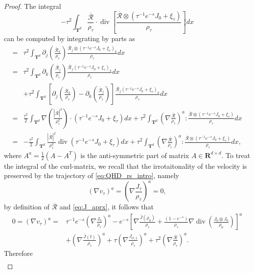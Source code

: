 \documentclass[10pt,a4paper]{amsart}
\def\R{{\mathbf R}}%
\def\T{{\mathbf T}}%
\def\d{{\partial}}
\DeclareMathOperator{\diver}{div}
\begin{document}
\begin{proof}
The integral
\[
-\tau^2\int_{\T^d} \frac{\overline{\mathcal{R}}}{\rho_\tau}\cdot\diver\left[\frac{\overline{\mathcal{R}}\otimes(\tau^{-1}e^{-s}J_0+\xi_\tau)}{\rho_\tau}\right]dx
\]
can be computed by integrating by parts as
\begin{align*}
=&\tau^2\int_{\T^d} \d_j\left(\frac{\overline{\mathcal{R}}_k}{\rho_\tau}\right)\frac{\overline{\mathcal{R}}_j\otimes(\tau^{-1}e^{-s}J_0+\xi_\tau)_k}{\rho_\tau}dx\\
=&\tau^2\int_{\T^d} \d_k\left(\frac{\overline{\mathcal{R}}_j}{\rho_\tau}\right)\frac{\overline{\mathcal{R}}_j(\tau^{-1}e^{-s}J_0+\xi_\tau)_k}{\rho_\tau}dx\\
&+\tau^2\int_{\T^d} \left[\d_j\left(\frac{\overline{\mathcal{R}}_k}{\rho_\tau}\right)-\d_k\left(\frac{\overline{\mathcal{R}}_j}{\rho_\tau}\right)\right]\frac{\overline{\mathcal{R}}_j(\tau^{-1}e^{-s}J_0+\xi_\tau)_k}{\rho_\tau}dx\\
=&\frac{\tau^2}{2}\int_{\T^d} \nabla\left(\frac{|\overline{\mathcal{R}}|^2}{\rho_\tau^2}\right)\cdot(\tau^{-1}e^{-s}J_0+\xi_\tau) dx+\tau^2\int_{\T^d} \left(\nabla\frac{\overline{\mathcal{R}}}{\rho_\tau}\right)^a:\frac{\overline{\mathcal{R}}\otimes(\tau^{-1}e^{-s}J_0+\xi_\tau)}{\rho_\tau}dx\\
=&-\frac{\tau^2}{2}\int_{\T^d}\frac{|\overline{\mathcal{R}}|^2}{\rho_\tau^2}\diver(\tau^{-1}e^{-s}J_0+\xi_\tau)dx+\tau^2\int_{\T^d} \left(\nabla\frac{\overline{\mathcal{R}}}{\rho_\tau}\right)^a:\frac{\overline{\mathcal{R}}\otimes(\tau^{-1}e^{-s}J_0+\xi_\tau)}{\rho_\tau}dx,
\end{align*}
where $A^a=\frac12(A-A^T)$ is the anti-symmetric part of matrix $A\in\R^{d\times d}$. 
To treat the integral of the curl-matrix, we recall that the irrotaitonality of the velocity is preserved by the trajectory of \eqref{eq:QHD_rs_intro}, namely 
\[
(\nabla v_\tau)^a=\left(\nabla\frac{J_\tau}{\rho_\tau}\right)^a=0,
\]
by definition of $\overline{\mathcal{R}}$ and \eqref{eq:J_aprx}, it follows that
\begin{align*}
0=(\nabla v_\tau)^a=&\tau^{-1} e^{-s}\left(\nabla\frac{J_0}{\rho_\tau}\right)^a-e^{-s}\left[\nabla\frac{\bar J(\rho_0)}{\rho_\tau}+\frac{(1-e^{-s})}{\rho_\tau}\nabla\diver\left(\frac{J_0\otimes J_0}{\rho_0}\right)\right]^a\\
&+\left(\nabla\frac{\bar J(t)}{\rho_\tau}\right)^a+\tau \left(\nabla\frac{J_{\mathcal{O},1}}{\rho_\tau}\right)^a+\tau^2 \left(\nabla\frac{\overline{\mathcal{R}}}{\rho_\tau}\right)^a.
\end{align*}
Therefore
\begin{align*}

\end{align*}
\end{proof}
\end{document}
